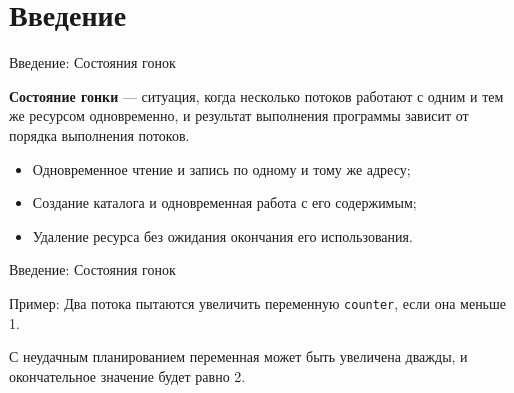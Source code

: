     \section{Введение}

    \begin{frame}[label=current]{Введение: Состояния гонок}

        \textbf{Состояние гонки} --- ситуация, когда несколько потоков работают с одним и тем же ресурсом одновременно,
        и результат выполнения программы зависит от порядка выполнения потоков.

        \begin{itemize}
            \item Одновременное чтение и запись по одному и тому же адресу;
            \item Создание каталога и одновременная работа с его содержимым;
            \item Удаление ресурса без ожидания окончания его использования.
        \end{itemize}


    \end{frame}

    \begin{frame}[label=current]{Введение: Состояния гонок}

        Пример: Два потока пытаются увеличить переменную \texttt{counter}, если она меньше 1.

        

        С неудачным планированием переменная может быть увеличена дважды, и окончательное значение будет равно 2.


    \end{frame}

